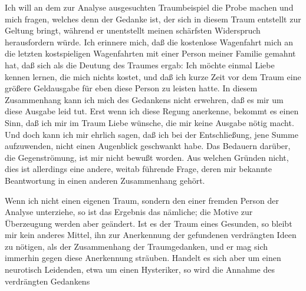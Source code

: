 \documentclass[twoside=true,titlepage=false,open=any, parskip=never, fontsize=10pt, headings=small, chapterprefix=false, appendixprefix=false]{scrbook}
\begin{document}
            
        \pstart
        Ich will an dem zur Analyse ausgesuchten Traumbeispiel die Probe machen und mich
               fragen, welches denn der Gedanke ist, der sich in diesem Traum entstellt zur
               Geltung bringt, während er unentstellt meinen schärfsten Widerspruch
               herausfordern würde. Ich erinnere mich, daß die kostenlose Wagenfahrt mich an
               die letzten kostspieligen Wagenfahrten mit einer Person meiner Familie
               gemahnt hat, daß sich als die Deutung des Traumes ergab: Ich möchte einmal Liebe
               kennen lernen, die mich nichts kostet, und daß ich kurze Zeit vor dem Traum eine
               größere Geldausgabe für eben diese Person zu leisten hatte. In diesem
               Zusammenhang kann ich mich des Gedankens nicht erwehren,
               daß es mir um diese Ausgabe leid tut. Erst wenn
               ich diese Regung anerkenne, bekommt es einen Sinn, daß ich mir im Traum
               Liebe wünsche, die mir keine Ausgabe nötig macht. Und doch kann ich mir ehrlich
               sagen, daß ich bei der Entschließung, jene Summe aufzuwenden, nicht
               einen Augenblick geschwankt habe. Das Bedauern darüber, die Gegenströmung,
               ist mir nicht bewußt worden. Aus welchen Gründen nicht, dies ist allerdings
               eine andere, weitab führende Frage, deren mir bekannte Beantwortung in einen
               anderen Zusammenhang gehört.
        \pend
    
            
        \pstart
        Wenn ich nicht einen eigenen Traum, sondern den einer fremden Person der Analyse
               unterziehe, so ist das Ergebnis das nämliche; die Motive zur Überzeugung werden
               aber geändert. Ist es der Traum eines Gesunden, so bleibt mir kein anderes
               Mittel, ihn zur Anerkennung der gefundenen verdrängten Ideen zu nötigen, als der
               Zusammenhang der Traumgedanken, und er mag sich immerhin gegen diese Anerkennung
               sträuben. Handelt es sich aber um einen neurotisch Leidenden, etwa um einen
               Hysteriker, so wird die Annahme des verdrängten Gedankens
        \pend
    
         
            
            
            
\end{document}
